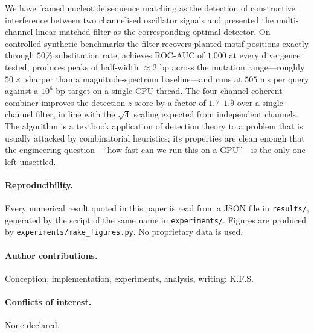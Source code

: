 \documentclass[11pt,a4paper]{article}
\theoremstyle{definition}
\theoremstyle{remark}
\begin{document}
We have framed nucleotide sequence matching as the detection of
constructive interference between two channelised oscillator signals
and presented the multi-channel linear matched filter as the
corresponding optimal detector. On controlled synthetic benchmarks the
filter recovers planted-motif positions exactly through $50\%$
substitution rate, achieves ROC-AUC of $1.000$ at every divergence
tested, produces peaks of half-width $\approx 2$ bp across the
mutation range---roughly $50 \times$ sharper than a magnitude-spectrum
baseline---and runs at $505$ ms per query against a $10^6$-bp target on
a single CPU thread. The four-channel coherent combiner improves the
detection $z$-score by a factor of $1.7$--$1.9$ over a single-channel
filter, in line with the $\sqrt{4}$ scaling expected from independent
channels. The algorithm is a textbook application of detection theory
to a problem that is usually attacked by combinatorial heuristics; its
properties are clean enough that the engineering question---``how fast
can we run this on a GPU''---is the only one left unsettled.

\paragraph{Reproducibility.} Every numerical result quoted in this
paper is read from a JSON file in \verb|results/|, generated by the
script of the same name in \verb|experiments/|. Figures are produced
by \verb|experiments/make_figures.py|. No proprietary data is used.

\paragraph{Author contributions.} Conception, implementation,
experiments, analysis, writing: K.F.S.

\paragraph{Conflicts of interest.} None declared.


\end{document}
